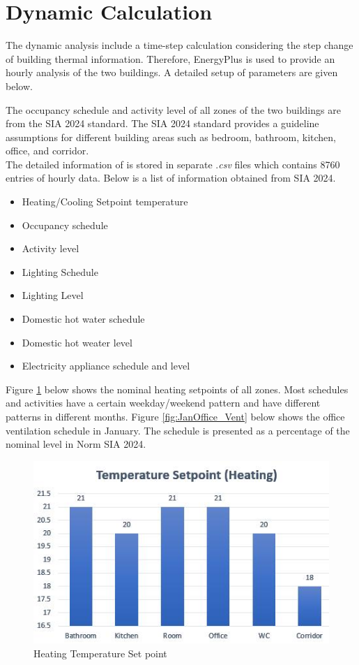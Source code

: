 \documentclass[a4paper, oneside]{discothesis}
\begin{document}
		
	\section{Dynamic Calculation}
		The dynamic analysis include a time-step calculation considering the step change of building thermal information. Therefore, EnergyPlus is used to provide an hourly analysis of the two buildings. A detailed setup of parameters are given below.
		
		The occupancy schedule and activity level of all zones of the two buildings are from the SIA 2024 standard. The SIA 2024 standard provides a guideline assumptions for different building areas such as bedroom, bathroom, kitchen, office, and corridor.\\

		The detailed information of is stored in separate .\textit{csv} files which contains 8760 entries of hourly data. Below is a list of information obtained from SIA 2024.
				\begin{itemize}
					\item Heating/Cooling Setpoint temperature
					\item Occupancy schedule
					\item Activity level
					\item Lighting Schedule
					\item Lighting Level
					\item Domestic hot water schedule
					\item Domestic hot weater level
					\item Electricity appliance schedule and level
				\end{itemize}

		Figure \ref{fig:HeatingSP} below shows the nominal heating setpoints of all zones. Most schedules and activities have a certain weekday/weekend pattern and have different patterns in different months. Figure \ref{fig:JanOffice_Vent} below shows the office ventilation schedule in January. The schedule is presented as a percentage of the nominal level in Norm SIA 2024.\\
		
		\begin{figure}[H]
		\centering
		\includegraphics[scale=1]{TempSetpoint.jpg}
		\caption{Heating Temperature Set point}
		\label{fig:HeatingSP}
		\end{figure}
		
\end{document}
